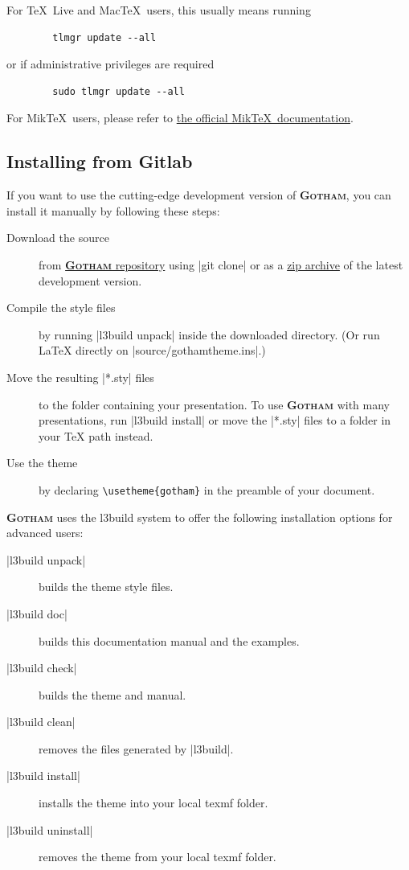 \documentclass{l3doc}
\providecommand{\themename}{\textbf{\textsc{Gotham}}\xspace}
\begin{document}
	For \TeX\ Live and Mac\TeX\ users, this usually means running
	\begin{lstlisting}
		tlmgr update --all
	\end{lstlisting}
	or if administrative privileges are required
	\begin{lstlisting}
		sudo tlmgr update --all
	\end{lstlisting}

	For Mik\TeX\ users, please refer to \href{https://miktex.org/howto/update-miktex}{the official Mik\TeX\ documentation}.


\subsection{Installing from Gitlab}
	If you want to use the cutting-edge development version of \themename, you can install it manually by following these steps:
	\begin{description}
		\item[Download the source] from
			\href{https://gitlab.com/RomainNOEL/beamertheme-gotham}{\themename repository}
			using |git clone| or as a
			\href{https://gitlab.com/RomainNOEL/beamertheme-gotham/-/archive/master/beamertheme-gotham-master.zip}{zip archive}
			of the latest development version.
		\item[Compile the style files] by running |l3build unpack| inside the downloaded	directory.
			(Or run \LaTeX{} directly on |source/gothamtheme.ins|.)
		\item[Move the resulting |*.sty| files] to the folder containing your presentation.
			To use \themename with many presentations, run
			|l3build install| or move the |*.sty| files to a folder in your \TeX{} path instead.
		\item[Use the theme] by declaring \lstinline|\usetheme{gotham}| in the preamble of your document.
	\end{description}

	\themename uses the l3build system to offer the following installation options for advanced users:
	\begin{description}
		\item[|l3build unpack|] builds the theme style files.
		\item[|l3build doc|] builds this documentation manual and the examples.
		\item[|l3build check|] builds the theme and manual.
		\item[|l3build clean|] removes the files generated by |l3build|.
		\item[|l3build install|] installs the theme into your local texmf folder.
		\item[|l3build uninstall|] removes the theme from your local texmf folder.
	\end{description}
\end{document}
